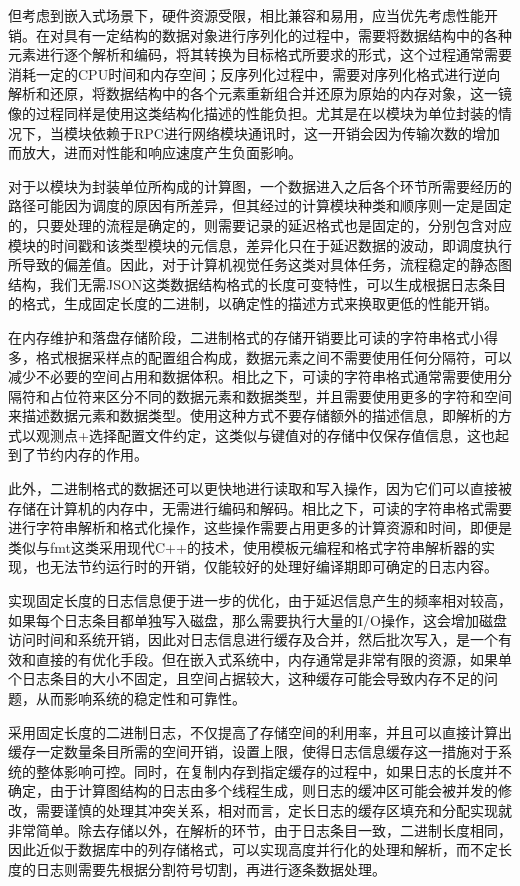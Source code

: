 \documentclass[master,anonymous]{shtthesis}
\begin{document}
但考虑到嵌入式场景下，硬件资源受限，相比兼容和易用，应当优先考虑性能开销。在对具有一定结构的数据对象进行序列化的过程中，需要将数据结构中的各种元素进行逐个解析和编码，将其转换为目标格式所要求的形式，这个过程通常需要消耗一定的CPU时间和内存空间；反序列化过程中，需要对序列化格式进行逆向解析和还原，将数据结构中的各个元素重新组合并还原为原始的内存对象，这一镜像的过程同样是使用这类结构化描述的性能负担。尤其是在以模块为单位封装的情况下，当模块依赖于RPC进行网络模块通讯时，这一开销会因为传输次数的增加而放大，进而对性能和响应速度产生负面影响。

对于以模块为封装单位所构成的计算图，一个数据进入之后各个环节所需要经历的路径可能因为调度的原因有所差异，但其经过的计算模块种类和顺序则一定是固定的，只要处理的流程是确定的，则需要记录的延迟格式也是固定的，分别包含对应模块的时间戳和该类型模块的元信息，差异化只在于延迟数据的波动，即调度执行所导致的偏差值。因此，对于计算机视觉任务这类对具体任务，流程稳定的静态图结构，我们无需JSON这类数据结构格式的长度可变特性，可以生成根据日志条目的格式，生成固定长度的二进制，以确定性的描述方式来换取更低的性能开销。

在内存维护和落盘存储阶段，二进制格式的存储开销要比可读的字符串格式小得多，格式根据采样点的配置组合构成，数据元素之间不需要使用任何分隔符，可以减少不必要的空间占用和数据体积。相比之下，可读的字符串格式通常需要使用分隔符和占位符来区分不同的数据元素和数据类型，并且需要使用更多的字符和空间来描述数据元素和数据类型。使用这种方式不要存储额外的描述信息，即解析的方式以观测点+选择配置文件约定，这类似与键值对的存储中仅保存值信息，这也起到了节约内存的作用。

此外，二进制格式的数据还可以更快地进行读取和写入操作，因为它们可以直接被存储在计算机的内存中，无需进行编码和解码。相比之下，可读的字符串格式需要进行字符串解析和格式化操作，这些操作需要占用更多的计算资源和时间，即便是类似与fmt这类采用现代C++的技术，使用模板元编程和格式字符串解析器的实现，也无法节约运行时的开销，仅能较好的处理好编译期即可确定的日志内容。

实现固定长度的日志信息便于进一步的优化，由于延迟信息产生的频率相对较高，如果每个日志条目都单独写入磁盘，那么需要执行大量的I/O操作，这会增加磁盘访问时间和系统开销，因此对日志信息进行缓存及合并，然后批次写入，是一个有效和直接的有优化手段。但在嵌入式系统中，内存通常是非常有限的资源，如果单个日志条目的大小不固定，且空间占据较大，这种缓存可能会导致内存不足的问题，从而影响系统的稳定性和可靠性。

采用固定长度的二进制日志，不仅提高了存储空间的利用率，并且可以直接计算出缓存一定数量条目所需的空间开销，设置上限，使得日志信息缓存这一措施对于系统的整体影响可控。同时，在复制内存到指定缓存的过程中，如果日志的长度并不确定，由于计算图结构的日志由多个线程生成，则日志的缓冲区可能会被并发的修改，需要谨慎的处理其冲突关系，相对而言，定长日志的缓存区填充和分配实现就非常简单。除去存储以外，在解析的环节，由于日志条目一致，二进制长度相同，因此近似于数据库中的列存储格式，可以实现高度并行化的处理和解析，而不定长度的日志则需要先根据分割符号切割，再进行逐条数据处理。
\end{document}
